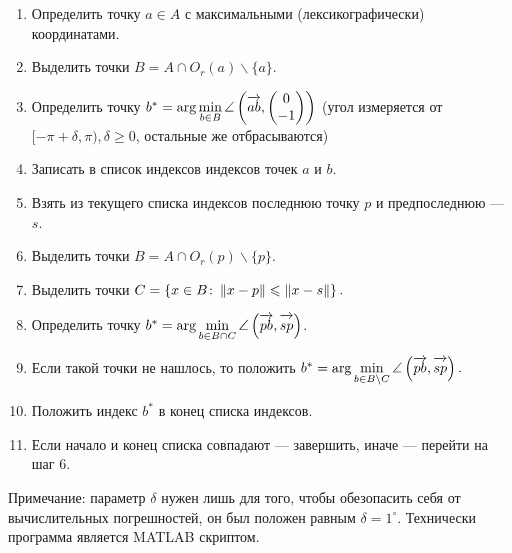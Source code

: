 \begin{enumerate}
  \item Определить точку $a\in A$ с максимальными (лексикографически) координатами.
  \item Выделить точки $B = A \cap O_r(a)\backslash\{a\}$. 
  \item Определить точку $b^* = \arg\min\limits_{b\in B} \angle\left(\overrightarrow{ab\mathstrut}, \begin{pmatrix} 0 \\ -1 \end{pmatrix}\right)$ (угол измеряется от $[-\pi+\delta, \pi), \delta \ge 0$, остальные же отбрасываются)
  \item Записать в список индексов индексов точек $a$ и $b$.
  \item Взять из текущего списка индексов последнюю точку $p$ и предпоследнюю --- $s$.
  \item Выделить точки $B = A \cap O_r(p) \backslash \{p\}.$ 
  \item Выделить точки $C = \left\{x\in B \colon \left\|{x-p}\right\|\leqslant \left\|{x-s}\right\|\right\}.$
  \item Определить точку $b^* = \arg\min\limits_{b\in B\cap C} \angle\left(\overrightarrow{pb\mathstrut}, \overrightarrow{sp\mathstrut}\right)$.
  \item Если такой точки не нашлось, то положить $b^* = \arg\min\limits_{b\in B \backslash C} \angle\left(\overrightarrow{pb\mathstrut}, \overrightarrow{sp\mathstrut}\right).$
  \item Положить индекс $b^*$ в конец списка индексов.
  \item Если начало и конец списка совпадают --- завершить, иначе --- перейти на шаг 6.
\end{enumerate}
Примечание: параметр $\delta$ нужен лишь для того, чтобы обезопасить себя от вычислительных погрешностей, он был положен равным $\delta = 1^\circ.$
Технически программа является MATLAB скриптом. 
 
